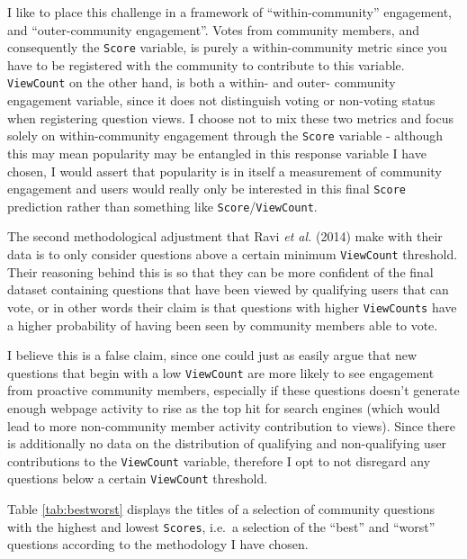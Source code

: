 \documentclass[11pt,preprint, authoryear]{article}
\numberwithin{equation}{section}
\begin{document}
I like to place this challenge in a framework of ``within-community''
engagement, and ``outer-community engagement''. Votes from community
members, and consequently the \texttt{Score} variable, is purely a
within-community metric since you have to be registered with the
community to contribute to this variable. \texttt{ViewCount} on the
other hand, is both a within- and outer- community engagement variable,
since it does not distinguish voting or non-voting status when
registering question views. I choose not to mix these two metrics and
focus solely on within-community engagement through the \texttt{Score}
variable - although this may mean popularity may be entangled in this
response variable I have chosen, I would assert that popularity is in
itself a measurement of community engagement and users would really only
be interested in this final \texttt{Score} prediction rather than
something like \texttt{Score}/\texttt{ViewCount}.

The second methodological adjustment that Ravi \emph{et al.} (2014) make
with their data is to only consider questions above a certain minimum
\texttt{ViewCount} threshold. Their reasoning behind this is so that
they can be more confident of the final dataset containing questions
that have been viewed by qualifying users that can vote, or in other
words their claim is that questions with higher \texttt{ViewCounts} have
a higher probability of having been seen by community members able to
vote.

I believe this is a false claim, since one could just as easily argue
that new questions that begin with a low \texttt{ViewCount} are more
likely to see engagement from proactive community members, especially if
these questions doesn't generate enough webpage activity to rise as the
top hit for search engines (which would lead to more non-community
member activity contribution to views). Since there is additionally no
data on the distribution of qualifying and non-qualifying user
contributions to the \texttt{ViewCount} variable, therefore I opt to not
disregard any questions below a certain \texttt{ViewCount} threshold.

Table \ref{tab:bestworst} displays the titles of a selection of
community questions with the highest and lowest \texttt{Scores}, i.e.~a
selection of the ``best'' and ``worst'' questions according to the
methodology I have chosen.

\footnotesize
\end{document}
